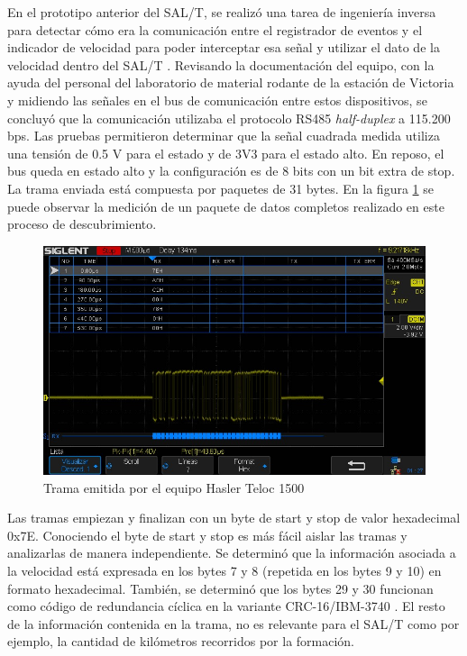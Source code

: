 En el prototipo anterior del SAL/T, se realizó una tarea de ingeniería inversa para detectar cómo era la comunicación entre el registrador de eventos y el indicador de velocidad para poder interceptar esa señal y utilizar el dato de la velocidad dentro del SAL/T \cite{salt_ivan}. Revisando la documentación del equipo, con la ayuda del personal del laboratorio de material rodante de la estación de Victoria y midiendo las señales en el bus de comunicación entre estos dispositivos, se concluyó que la comunicación utilizaba el protocolo RS485 \textit{half-duplex} a 115.200 bps. Las pruebas permitieron determinar que la señal cuadrada medida utiliza una tensión de 0.5 V para el estado y de 3V3 para el estado alto. En reposo, el bus queda en estado alto y la configuración es de 8 bits con un bit extra de stop. La trama enviada está compuesta por paquetes de 31 bytes. En la figura \ref{fig:hasler_trama} se puede observar la medición de un paquete de datos completos realizado en este proceso de descubrimiento. 

\begin{figure}[H]
    \centering
    \includegraphics[width =\linewidth]{img/hasler_trama.png}
    \caption{Trama emitida por el equipo Hasler Teloc 1500}
    \label{fig:hasler_trama}
\end{figure}    

Las tramas empiezan y finalizan con un byte de start y stop de valor hexadecimal 0x7E. Conociendo el byte de start y stop es más fácil aislar las tramas y analizarlas de manera independiente. Se determinó que la información asociada a la velocidad está expresada en los bytes 7 y 8 (repetida en los bytes 9 y 10) en formato hexadecimal. También, se determinó que los bytes 29 y 30 funcionan como código de redundancia cíclica en la variante CRC-16/IBM-3740 \cite{crc}. El resto de la información contenida en la trama, no es relevante para el SAL/T como por ejemplo, la cantidad de kilómetros recorridos por la formación. \\


